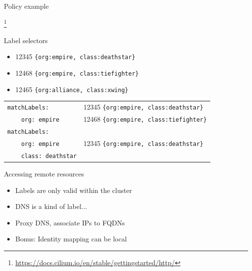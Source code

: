 \documentclass[black,white]{beamer}
\newcommand\blfootnote[1]{%
  \begingroup
  \renewcommand\thefootnote{}\footnote{#1}%
  \addtocounter{footnote}{-1}%
  \endgroup
}
\DeclareRobustCommand{\#}{\adjustbox{valign=B,totalheight=.57\baselineskip}{\oldhash}}%
\begin{document}
    \begin{frame}{Policy example}
        
        \blfootnote{\tiny \url{https://docs.cilium.io/en/stable/gettingstarted/http/}}
    \end{frame}

    \begin{frame}[fragile]{Label selectors}
        \vfill
        \begin{itemize}
            \item 12345 \verb+{org:empire, class:deathstar}+ \smallskip
            \item 12468 \verb+{org:empire, class:tiefighter}+ \smallskip
            \item 12465 \verb+{org:alliance, class:xwing}+ \smallskip
        \end{itemize}
        \vfill
        \begin{tabular}{ | l | l | }
            \hline
            \verb+matchLabels:+ & 12345 \verb+{org:empire, class:deathstar}+ \\
            \verb+    org: empire+ & 12468 \verb+{org:empire, class:tiefighter}+ \\
            \hline
            \verb+matchLabels:+ & \\
            \verb+    org: empire+ & 12345 \verb+{org:empire, class:deathstar}+ \\
            \verb+    class: deathstar+ & \\
            \hline
        \end{tabular}
        \vfill
    \end{frame}

    \begin{frame}{Accessing remote resources}
        \begin{itemize}
            \item Labels are only valid within the cluster \medskip
            \item DNS is a kind of label... \medskip
            \item Proxy DNS, associate IPs to FQDNs \medskip
            \item Bonus: Identity mapping can be local \medskip
        \end{itemize}
    \end{frame}
\end{document}
